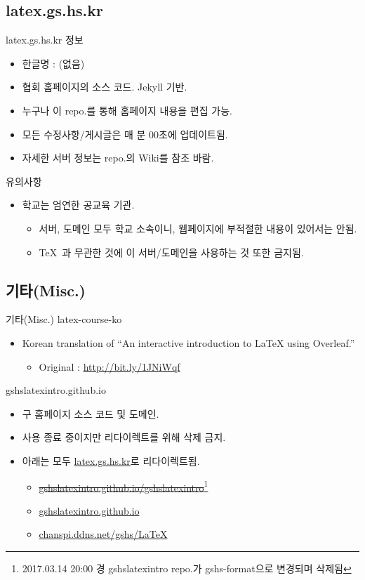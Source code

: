 \documentclass[12pt]{beamer}
\begin{document}
\subsection{latex.gs.hs.kr}
\begin{frame}{latex.gs.hs.kr}
	정보
	\begin{itemize}
		\item 한글명 : (없음)
		\item 협회 홈페이지의 소스 코드. Jekyll 기반.
		\item 누구나 이 repo.를 통해 홈페이지 내용을 편집 가능.
		\item 모든 수정사항/게시글은 매 분 00초에 업데이트됨.
		\item 자세한 서버 정보는 repo.의 Wiki를 참조 바람.
	\end{itemize}
	\vfill
	유의사항
	\begin{itemize}
		\item 학교는 엄연한 공교육 기관.
		\begin{itemize}
			\item 서버, 도메인 모두 학교 소속이니, 웹페이지에 부적절한 내용이 있어서는 안됨.
			\item \TeX\ 과 무관한 것에 이 서버/도메인을 사용하는 것 또한 금지됨.
		\end{itemize}
	\end{itemize}
	\vfill
\end{frame}
\subsection{기타(Misc.)}
\begin{frame}{기타(Misc.)}
	latex-course-ko
	\begin{itemize}
		\item Korean translation of ``An interactive introduction to LaTeX using Overleaf.''
		\begin{itemize}
			\item Original : \url{http://bit.ly/1JNiWqf}
		\end{itemize}
	\end{itemize}
	\vfill
	gshslatexintro.github.io
	\begin{itemize}
		\item 구 홈페이지 소스 코드 및 도메인.
		\item 사용 종료 중이지만 리다이렉트를 위해 삭제 금지.
		\item 아래는 모두 \url{latex.gs.hs.kr}로 리다이렉트됨.
		\begin{itemize}
			\item \sout{\url{gshslatexintro.github.io/gshslatexintro}}\footnote{2017.03.14 20:00 경 gshslatexintro repo.가 gshs-format으로 변경되며 삭제됨}
			\item \url{gshslatexintro.github.io}
			\item \url{chanspi.ddns.net/gshs/LaTeX}
		\end{itemize}
	\end{itemize}
	\vfill
\end{frame}
\end{document}
